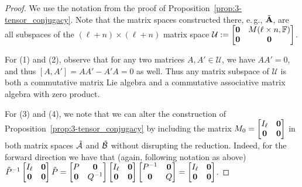 \documentclass[11pt]{article}
\begin{document}
\begin{proof}
We use the notation from the proof of Proposition~\ref{prop:3-tensor_conjugacy}. Note that the matrix spaces constructed there, e.\,g., $\tilde {\mathbf{A}}$, are all subspaces of the $(\ell + n) \times (\ell + n)$ matrix space $\mathcal{U} := \begin{bmatrix} \mathbf{0} & M(\ell \times n,\mathbb{F}) \\ \mathbf{0} & \mathbf{0} \end{bmatrix}$. 


For (1) and (2), observe that for any two matrices $A,A' \in \mathcal{U}$, we have $AA' = 0$, and thus $[A,A'] = AA' - A'A = 0$ as well. Thus any matrix subspace of $\mathcal{U}$ is both a commutative matrix Lie algebra and a commutative associative matrix algebra with zero product.

For (3) and (4), we note that we can alter the construction of Proposition~\ref{prop:3-tensor_conjugacy} by including the matrix $M_0 = \begin{bmatrix} I_\ell & \mathbf{0} \\ \mathbf{0} & \mathbf{0} \end{bmatrix}$ in both matrix spaces $\tilde {\mathcal{A}}$ and $\tilde {\mathcal{B}}$ without disrupting the reduction. Indeed, for the forward direction we have that (again, following notation as above) $\tilde P^{-1} \begin{bmatrix} I_\ell & \mathbf{0} \\ \mathbf{0} & \mathbf{0} \end{bmatrix} \tilde P = \begin{bmatrix} P & \mathbf{0} \\ \mathbf{0} & Q^{-1} \end{bmatrix}\begin{bmatrix} I_\ell & \mathbf{0} \\ \mathbf{0} & \mathbf{0} \end{bmatrix}\begin{bmatrix} P^{-1} & \mathbf{0} \\ \mathbf{0} & Q\end{bmatrix} = \begin{bmatrix} I_\ell & \mathbf{0} \\ \mathbf{0} & \mathbf{0} \end{bmatrix}$. 


\end{proof}
\end{document}
